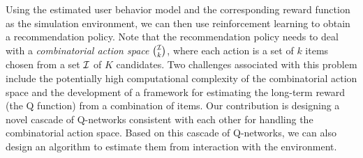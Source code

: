 \documentclass{article} %
\newcommand{\shuang}[1]{{\color{purple}{\bf\sf[ #1]}}}
\newcommand{\Li}[1]{{\color{cyan}{\bf\sf [Li: #1]}}}
\begin{document}
Using the estimated user behavior model and the corresponding reward function as the simulation environment, we can then use reinforcement learning to obtain a recommendation policy. Note that the recommendation policy needs to deal with a {\it combinatorial action space} ${\mathcal{I}} \choose k$, where each action is a set of $k$ items chosen from a \Li{\st{larger} large} set ${\mathcal{I}}$ of $K$ candidates. \Li{$K$ is not defined.}
Two challenges associated with this problem include the potentially high computational complexity of the combinatorial action space and the development of a framework for estimating the long-term reward (the Q function) from a combination of items. Our contribution is designing a novel cascade of Q-networks consistent with each other for handling the combinatorial action space. Based on this cascade of Q-networks, we can also design an algorithm to estimate them from interaction with the environment. 




\end{document}
